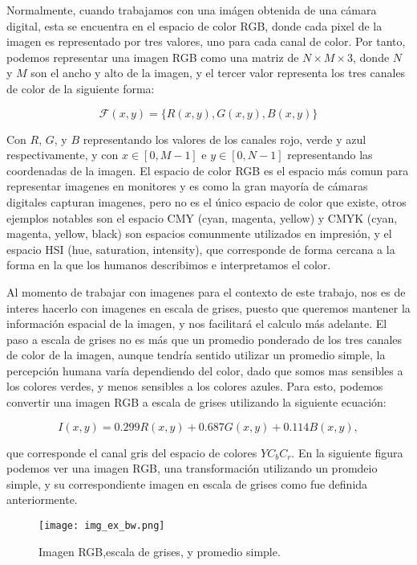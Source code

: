 Normalmente, cuando trabajamos con una im\'agen obtenida de una c\'amara digital, esta se encuentra en el espacio de color RGB, donde cada pixel de la imagen es representado por tres valores, uno para cada canal de color. Por tanto, podemos representar una imagen RGB como una matriz de $N \times M \times 3$, donde $N$ y $M$ son el ancho y alto de la imagen, y el tercer valor representa los tres canales de color de la siguiente forma:

$$
\mathcal{F}(x, y)=\{R(x, y), G(x, y), B(x, y)\}
$$


Con $R$, $G$, y $B$ representando los valores de los canales rojo, verde y azul respectivamente, y con $x\in[0,M-1]$ e $y\in[0,N-1]$ representando las coordenadas de la imagen. El espacio de color RGB es el espacio m\'as comun para representar imagenes en monitores y es como la gran mayoría de c\'amaras digitales capturan imagenes, pero no es el \'unico espacio de color que existe, otros ejemplos notables son el espacio CMY (cyan, magenta, yellow) y CMYK (cyan, magenta, yellow, black) son espacios comunmente utilizados en impresi\'on, y el espacio HSI (hue, saturation, intensity), que corresponde de forma cercana a la forma en la que los humanos describimos e interpretamos el color. \cite{DigitalImageProcessing}

Al momento de trabajar con imagenes para el contexto de este trabajo, nos es de interes hacerlo con imagenes en escala de grises, puesto que queremos mantener la informaci\'on espacial de la imagen, y nos facilitar\'a el calculo m\'as adelante. El paso a escala de grises no es más que un promedio ponderado de los tres canales de color de la imagen, aunque tendría sentido utilizar un promedio simple, la percepción humana varía dependiendo del color, dado que somos mas sensibles a los colores verdes, y menos sensibles a los colores azules. Para esto, podemos convertir una imagen RGB a escala de grises utilizando la siguiente ecuaci\'on:

\begin{equation}
    I(x, y)=0.299 R(x, y)+0.687 G(x, y)+0.114 B(x, y), 
    \label{eq:grayscale}
\end{equation}

que corresponde el canal gris del espacio de colores $YC_bC_r$. En la siguiente figura podemos ver una imagen RGB, una transformaci\'on utilizando un promdeio simple, y su correspondiente imagen en escala de grises como fue definida anteriormente.

\begin{figure}[H]
    \centering
    \texttt{[image: img\_ex\_bw.png]}
    \caption{Imagen RGB,escala de grises, y promedio simple.}
    \label{fig:rgb2gray}
\end{figure}


